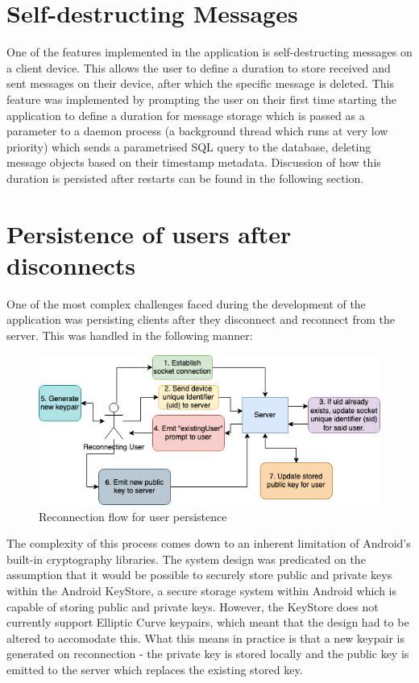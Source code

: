 \documentclass{mproj}
\begin{document}
\section{Self-destructing Messages}
One of the features implemented in the application is self-destructing messages on a client device. This allows the user to define a duration to store received and sent messages on their device, after which the specific message is deleted. This feature was implemented by prompting the user on their first time starting the application to define a duration for message storage which is passed as a parameter to a daemon process (a background thread which runs at very low priority) which sends a parametrised SQL query to the database, deleting message objects based on their timestamp metadata. Discussion of how this duration is persisted after restarts can be found in the following section.

\section{Persistence of users after disconnects}
One of the most complex challenges faced during the development of the application was persisting clients after they disconnect and reconnect from the server. This was handled in the following manner:
\begin{figure}[H]
	\includegraphics[scale=0.6]{images/reconnection-flow.png}
	\caption{Reconnection flow for user persistence}
\end{figure}
The complexity of this process comes down to an inherent limitation of Android's built-in cryptography libraries. The system design was predicated on the assumption that it would be possible to securely store public and private keys within the Android KeyStore\cite{cooijmans2014analysis}, a secure storage system within Android which is capable of storing public and private keys. However, the KeyStore does not currently support Elliptic Curve keypairs, which meant that the design had to be altered to accomodate this. What this means in practice is that a new keypair is generated on reconnection - the private key is stored locally and the public key is emitted to the server which replaces the existing stored key.
\end{document}
